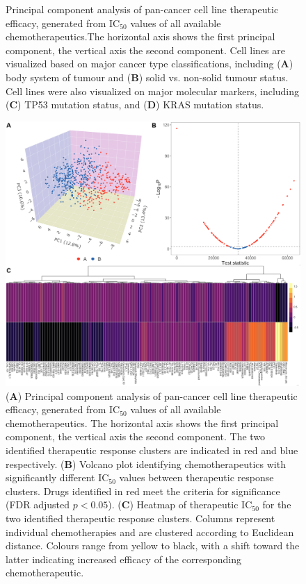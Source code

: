 \documentclass[10pt, letterpaper]{article}
\begin{document}
\begin{multicols*}{2}
\begin{figure}[!ht]
	\caption{Principal component analysis of pan-cancer cell line therapeutic efficacy, generated from IC$_{50}$ values of all available chemotherapeutics.The horizontal axis shows the first principal component, the vertical axis the second component. Cell lines are visualized based on major cancer type classifications, including (\textbf{A}) body system of tumour and (\textbf{B}) solid vs. non-solid tumour status. Cell lines were also visualized on major molecular markers, including (\textbf{C}) TP53 mutation status, and (\textbf{D}) KRAS mutation status.}
	\label{fig:overall_pca}
\end{figure}


\begin{figure}[!ht]
    \centering
    \includegraphics[width=\textwidth]{Figures/clustering.png}

    \caption{(\textbf{A}) Principal component analysis of pan-cancer cell line therapeutic efficacy, generated from IC$_{50}$ values of all available chemotherapeutics. The horizontal axis shows the first principal component, the vertical axis the second component. The two identified therapeutic response clusters are indicated in red and blue respectively. (\textbf{B}) Volcano plot identifying chemotherapeutics with significantly different IC$_{50}$ values between therapeutic response clusters. Drugs identified in red meet the criteria for significance (FDR adjusted $p<0.05$). (\textbf{C}) Heatmap of therapeutic IC$_{50}$ for the two identified therapeutic response clusters. Columns represent individual chemotherapies and are clustered according to Euclidean distance. Colours range from yellow to black, with a shift toward the latter indicating increased efficacy of the corresponding chemotherapeutic.}
    \label{fig:clustering}
\end{figure}



\end{multicols*}
\end{document}
